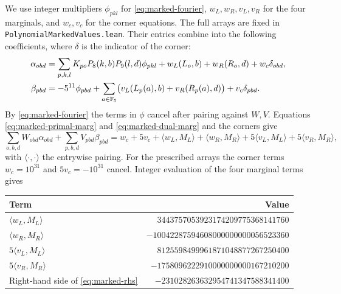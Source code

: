 We use integer multipliers \(\phi_{pkl}\) for \eqref{eq:marked-fourier}, \(w_L,w_R,v_L,v_R\) for the four marginals, and \(w_c,v_c\) for the corner equations. The full arrays are fixed in \texttt{PolynomialMarkedValues.lean}. Their entries combine into the following coefficients, where \(\delta\) is the indicator of the corner:
\begin{align}
 \alpha_{obd}
 &=\sum_{p,k,l} K_{po}P_8(k,b)P_9(l,d)\phi_{pkl}
   +w_L(L_o,b)+w_R(R_o,d)+w_c\delta_{obd}, \notag\\
 \beta_{pbd}
 &=-5^{11}\phi_{pbd}
   +\sum_{a\in\mathbb F_5}\bigl(v_L(L_p(a),b)+v_R(R_p(a),d)\bigr)
   +v_c\delta_{pbd}.
 \label{eq:marked-multipliers}
\end{align}
By \eqref{eq:marked-fourier} the terms in \(\phi\) cancel after pairing against \(W,V\). Equations \eqref{eq:marked-primal-marg} and \eqref{eq:marked-dual-marg} and the corners give
\begin{equation}\label{eq:marked-rhs}
 \sum_{o,b,d}W_{obd}\alpha_{obd}+\sum_{p,b,d}V_{pbd}\beta_{pbd}
 = w_c+5v_c+\langle w_L,M_L\rangle+\langle w_R,M_R\rangle
   +5\langle v_L,M_L\rangle+5\langle v_R,M_R\rangle ,
\end{equation}
with \(\langle\cdot,\cdot\rangle\) the entrywise pairing. For the prescribed arrays the corner terms \(w_c=10^{31}\) and \(5v_c=-10^{31}\) cancel. Integer evaluation of the four marginal terms gives
\begin{center}
\begin{tabular}{lr}
\toprule
Term & Value \\
\midrule
\(\langle w_L,M_L\rangle\) & \(3443757053923174209775368141760\)\\
\(\langle w_R,M_R\rangle\) & \(-10042287594608000000000056523360\)\\
\(5\langle v_L,M_L\rangle\)& \(8125598499961871048877267250400\)\\
\(5\langle v_R,M_R\rangle\)& \(-1758096222910000000000167210200\)\\
\midrule
Right-hand side of \eqref{eq:marked-rhs} & \(-231028263632954741347588341400\)\\
\bottomrule
\end{tabular}
\end{center}

